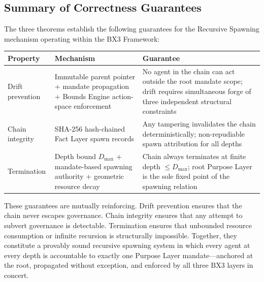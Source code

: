 \subsection{Summary of Correctness Guarantees}
\label{sec:correctness-summary}

The three theorems establish the following guarantees for the Recursive Spawning mechanism operating within the BX3 Framework:

\begin{center}
\begin{tabular}{llp{7.5cm}}
\toprule
\textbf{Property} & \textbf{Mechanism} & \textbf{Guarantee} \\
\midrule
Drift prevention & Immutable parent pointer + mandate propagation + Bounds Engine action-space enforcement & No agent in the chain can act outside the root mandate scope; drift requires simultaneous forge of three independent structural constraints \\
Chain integrity & SHA-256 hash-chained Fact Layer spawn records & Any tampering invalidates the chain deterministically; non-repudiable spawn attribution for all depths \\
Termination & Depth bound $D_{\max}$ + mandate-based spawning authority + geometric resource decay & Chain always terminates at finite depth $\leq D_{\max}$; root Purpose Layer is the sole fixed point of the spawning relation \\
\bottomrule
\end{tabular}
\end{center}

These guarantees are mutually reinforcing. Drift prevention ensures that the chain never escapes governance. Chain integrity ensures that any attempt to subvert governance is detectable. Termination ensures that unbounded resource consumption or infinite recursion is structurally impossible. Together, they constitute a provably sound recursive spawning system in which every agent at every depth is accountable to exactly one Purpose Layer mandate—anchored at the root, propagated without exception, and enforced by all three BX3 layers in concert.

\endinput